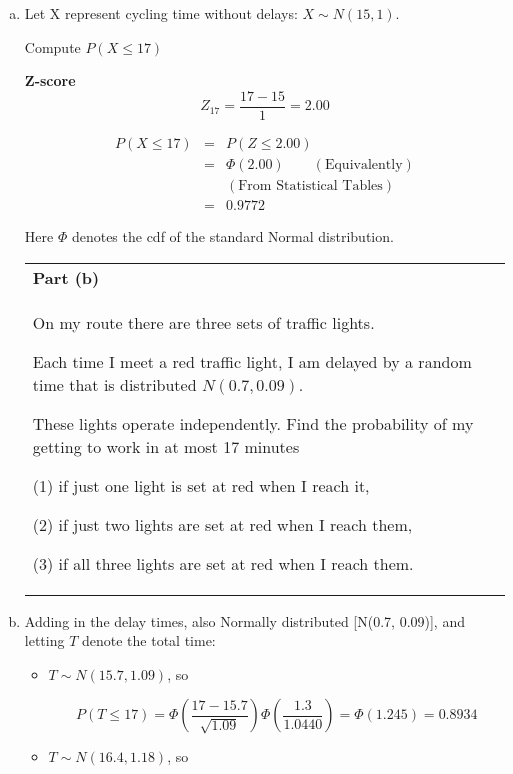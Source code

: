 \documentclass[a4paper,12pt]{article}
\begin{document}
\begin{enumerate}[(a)]
\item 

Let X represent cycling time without delays: $X \sim N(15, 1)$.

Compute $P(X \leq 17)$
\begin{framed}
\noindent \textbf{Z-score}
\[Z_{17} = \frac{17-15}{1}= 2.00\]
\end{framed}
\begin{eqnarray*} 
P(X \leq 17)  &=& P(Z \leq 2.00) \\
 &=& \Phi(2.00) \qquad (\mbox{Equivalently})\\
 & & (\mbox{From Statistical Tables}) \\
 &=& 0.9772
\end{eqnarray*} 

Here $\Phi$ denotes the cdf of the standard Normal distribution.

\newpage
\begin{table}[ht!]
     \centering
     \begin{tabular}{|p{15cm}|}
     \hline        
\noindent \textbf{Part (b)}\\ On my route there are three sets of traffic lights.

Each time I meet a red traffic light, I am delayed by a random time that is distributed $N(0.7, 0.09)$. 

These lights operate independently. Find the probability of my getting to work in at most 17 minutes

(1) if just one light is set at red when I reach it,

(2) if just two lights are set at red when I reach them,

(3) if all three lights are set at red when I reach them.

\\ \hline
      \end{tabular}
    \end{table}
    



\item  Adding in the delay times, also Normally distributed [N(0.7, 0.09)], and letting $T$ denote the total time:
\begin{itemize}
\item $T \sim N(15.7, 1.09)$, so

\[P(T \leq 17) = \Phi \left( \frac{17 - 15.7}{\sqrt{1.09}} \right) \Phi \left( \frac{1.3}{ 1.0440} \right)  = \Phi(1.245) = 0.8934\]
\item $T \sim N(16.4, 1.18)$, so




\end{itemize}
\end{enumerate}
\end{document}
